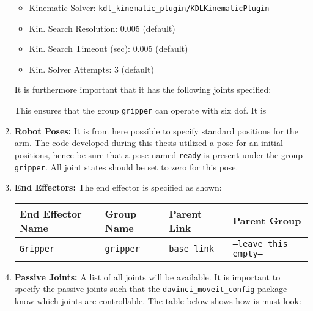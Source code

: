 \begin{enumerate}
\begin{itemize}
\item Kinematic Solver: \texttt{kdl\_kinematic\_plugin/KDLKinematicPlugin}
\item Kin. Search Resolution: 0.005 (default)
\item Kin. Search Timeout (sec): 0.005 (default)
\item Kin. Solver Attempts: 3 (default)
\end{itemize}
It is furthermore important that it has the following joints specified:
\renewcommand*\DTstylecomment{\rmfamily\color{gray}\textsc}
\renewcommand*\DTstyle{\ttfamily\textcolor{black}} 
\begin{figure}[H]
\end{figure}
This ensures that the group \texttt{gripper} can operate with six \gls{dof}. It is 
\item \textbf{Robot Poses:} It is from here possible to specify standard positions for the arm. The code developed during this thesis utilized a pose for an initial positions, hence be sure that a pose named \texttt{ready} is present under the group \texttt{gripper}. All joint states should be set to zero for this pose.
\item \textbf{End Effectors:} The end effector is specified as shown:
\begin{table}[H]
\hspace{1cm}\begin{tabular}{l|l|l|l}
\textbf{End Effector Name} & \textbf{Group Name}  & \textbf{Parent Link}  & \textbf{Parent Group}   \\
\hline
 \texttt{Gripper} & \texttt{gripper}  & \texttt{base\_link}  &  \texttt{--leave this empty--} \\
\end{tabular}
\end{table}
\item \textbf{Passive Joints:} A list of all joints will be available. It is important to specify the passive joints such that the \texttt{davinci\_moveit\_config} package know which joints are controllable. The table below shows how is must look:

\end{enumerate}
